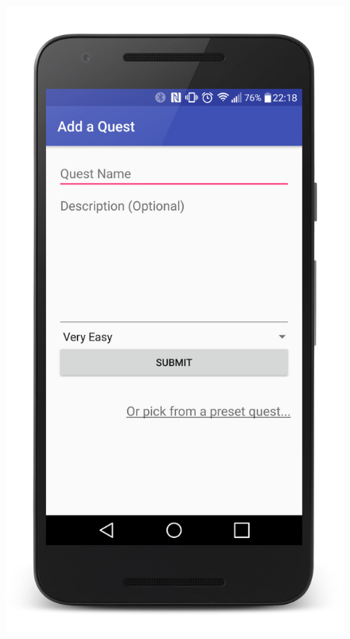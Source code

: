 \begin{figure}[ht]
\begin{minipage}[b]{0.25\linewidth}
    \includegraphics[width=1\linewidth]{../images/Screenshot/AddQuestScreen.jpg}
    \vspace{2ex}
  \end{minipage}%
  \begin{minipage}[b]{0.25\linewidth}
    \centering

\end{minipage}
\end{figure}

